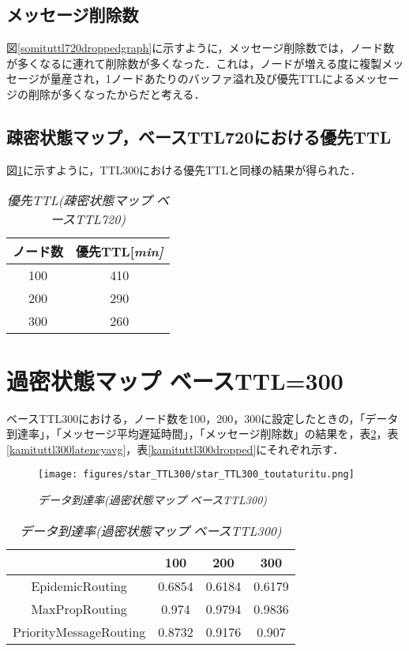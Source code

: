 \documentclass[11pt]{icsthesis}
\begin{document}
\subsection{メッセージ削除数}
図\ref{somituttl720droppedgraph}に示すように，メッセージ削除数では，ノード数が多くなるに連れて削除数が多くなった．これは，ノードが増える度に複製メッセージが量産され，1ノードあたりのバッファ溢れ及び優先TTLによるメッセージの削除が多くなったからだと考える．

\subsection{疎密状態マップ，ベースTTL720における優先TTL}
図\ref{priorityTTL_somitsu720}に示すように，TTL300における優先TTLと同様の結果が得られた．
\begin{table}[H]
	\begin{center}
			 \caption[]{\it{優先TTL(疎密状態マップ ベースTTL720)}}
			 \label{priorityTTL_somitsu720}
			 \begin{tabular}{|c|c|}
 \hline
 ノード数&優先TTL[\it{min}]\\
 \hline
 100&410\\
 \hline
 200&290\\
 \hline
 300&260\\
 \hline
			 \end{tabular}
		 \end{center}
 \end{table}

\section{過密状態マップ ベースTTL=300}
ベースTTL300における，ノード数を100，200，300に設定したときの，「データ到達率」，「メッセージ平均遅延時間」，「メッセージ削除数」の結果を，表\ref{kamituttl300deliveryprob}，表\ref{kamituttl300latencyavg}，表\ref{kamituttl300dropped}にそれぞれ示す．

\begin{figure}[h]
\centering
\texttt{[image: figures/star\_TTL300/star\_TTL300\_toutaturitu.png]}
\caption[]{\it{データ到達率(過密状態マップ ベースTTL300)}}
\label{kamituttl300deliveryprobgraph}
\end{figure}

\begin{table}[H]
 \begin{center}
      \caption[]{\it{データ到達率(過密状態マップ ベースTTL300)}}
      \label{kamituttl300deliveryprob}
      \begin{tabular}{|c|c|c|c|}
\hline
&100&200&300\\
\hline
EpidemicRouting&0.6854&0.6184&0.6179\\
\hline
MaxPropRouting&0.974&0.9794&0.9836\\
\hline
PriorityMessageRouting&0.8732&0.9176&0.907\\
\hline
      \end{tabular}
    \end{center}
\end{table}
\end{document}

